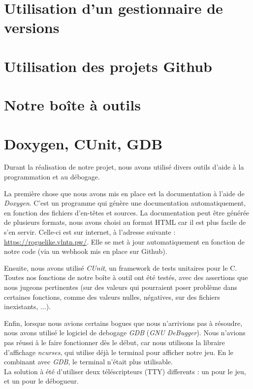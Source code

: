 \documentclass[12pt]{report}
\begin{document}
	\section{Utilisation d'un gestionnaire de versions}
	
	\section{Utilisation des projets Github}

	\section{Notre boîte à outils} 

	\section{Doxygen, CUnit, GDB}
	
		Durant la réalisation de notre projet, nous avons utilisé divers outils d'aide à la programmation et au débogage. 
		
		\vspace{12pt}		
		
		La première chose que nous avons mis en place est la documentation à l'aide de \emph{Doxygen}. C'est un programme qui génère une documentation automatiquement, en fonction des fichiers d'en-têtes et sources. La documentation peut être générée de plusieurs formats, nous avons choisi au format HTML car il est plus facile de s'en servir. Celle-ci est sur internet, à l'adresse suivante : \url{https://roguelike.vlntn.pw/}. Elle se met à jour automatiquement en fonction de notre code (via un webhook mis en place sur Github).
		
		\vspace{12pt}
		
		Ensuite, nous avons utilisé \emph{CUnit}, un framework de tests unitaires pour le C. Toutes nos fonctions de notre boîte à outil ont été testés, avec des assertions que nous jugeons pertinentes (sur des valeurs qui pourraient poser problème dans certaines fonctions, comme des valeurs nulles, négatives, sur des fichiers inexistants, ...).
		
		\vspace{12pt}
		
		Enfin, lorsque nous avions certains bogues que nous n'arrivions pas à résoudre, nous avons utilisé le logiciel de debogage \emph{GDB} (\emph{GNU DeBugger}). Nous n'avions pas réussi à le faire fonctionner dès le début, car nous utilisons la libraire d'affichage \emph{ncurses}, qui utilise déjà le terminal pour afficher notre jeu. En le combinant avec \emph{GDB}, le terminal n'était plus utilisable.\\
		La solution à été d'utiliser deux téléscripteurs (\textsc{TTY}) differents : un pour le jeu, et un pour le débogueur.
\end{document}
